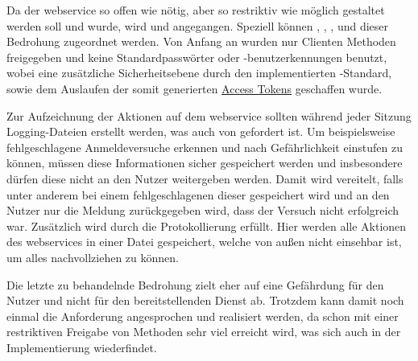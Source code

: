 	Da der \gls{webservice} so offen wie nötig,
	aber so restriktiv wie möglich gestaltet werden soll und wurde,
	wird  
	und  angegangen.
	Speziell können ,
	,
	,
	und  dieser Bedrohung zugeordnet werden.
	Von Anfang an wurden nur  Clienten Methoden freigegeben
	und keine Standardpasswörter oder -benutzerkennungen benutzt,
	wobei eine zusätzliche Sicherheitsebene durch den implementierten -Standard,
	sowie dem Auslaufen der somit generierten \hyperref[par:access-token]{Access Tokens} geschaffen wurde.

	Zur Aufzeichnung der Aktionen auf dem \gls{webservice} sollten während jeder Sitzung Logging-Dateien erstellt werden,
	was auch von  gefordert ist.
	Um beispielsweise fehlgeschlagene Anmeldeversuche erkennen
	und nach Gefährlichkeit einstufen zu können,
	müssen diese Informationen sicher gespeichert werden
	und insbesondere dürfen diese nicht an den Nutzer weitergeben werden.
	Damit wird  vereitelt,
	falls unter anderem bei einem fehlgeschlagenen 
	dieser gespeichert wird
	und an den Nutzer nur die Meldung zurückgegeben wird,
	dass der Versuch nicht erfolgreich war.
	Zusätzlich wird durch die Protokollierung  erfüllt.
	Hier werden alle Aktionen des \glspl{webservice} in einer Datei gespeichert,
	welche von außen nicht einsehbar ist,
	um alles nachvollziehen zu können.

	Die letzte zu behandelnde Bedrohung 
	zielt eher auf eine Gefährdung für den Nutzer
	und nicht für den bereitstellenden Dienst ab.
	Trotzdem kann damit noch einmal die Anforderung  angesprochen
	und realisiert werden,
	da schon mit einer restriktiven Freigabe von Methoden sehr viel erreicht wird,
	was sich auch in der Implementierung wiederfindet.

